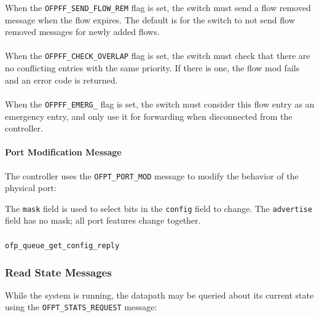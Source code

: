 
When the \verb|OFPFF_SEND_FLOW_REM| flag is set, the switch must send a flow removed message when the flow expires.  The default is for the switch to not send flow removed messages for newly added flows.  
\\\\
When the \verb|OFPFF_CHECK_OVERLAP| flag is set, the switch must check that there are no conflicting entries with the same priority. If there is one, the flow mod fails and an error code is returned.
\\\\
When the \verb|OFPFF_EMERG_| flag is set, the switch must consider this flow entry as an emergency entry, and only use it for forwarding when disconnected from the controller.

\paragraph{Port Modification Message}
The controller uses the \verb|OFPT_PORT_MOD| message to modify the behavior of the physical port:


The \verb|mask| field is used to select bits in the \verb|config| field to change.  The \verb|advertise| field has no mask; all port features change together.

\subsubsection{}
 \verb|ofp_queue_get_config_reply| 

\subsubsection{Read State Messages}
While the system is running, the datapath may be queried about its current state using the \verb|OFPT_STATS_REQUEST| message:


